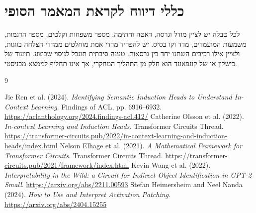 \documentclass[11pt,a4paper]{article}
\begin{document}
\section{כללי דיווח לקראת המאמר הסופי}
לכל טבלה יש לציין מודל וגרסה, דאטה וחתימה, מספר משפחות וקלטים, מספר הדגמות, משמעות המועמדים, מדד וקו בסיס. יש להפריד מדדי אמת מוחלטים ממדדי הצלחה בזוגות, ולציין אילו רכיבים השתנו יחד בין גרסאות. טענה סיבתית תוגבל לניסוי שבוצע. תיעוד של כישלון או של קונפאונד הוא חלק מן התהליך המחקרי, אך אינו תחליף לממצא מכניסטי.

\begin{thebibliography}{9}
\begin{english}
 Jie Ren et al. (2024). \emph{Identifying Semantic Induction Heads to Understand In-Context Learning}. Findings of ACL, pp. 6916--6932. \url{https://aclanthology.org/2024.findings-acl.412/}
 Catherine Olsson et al. (2022). \emph{In-context Learning and Induction Heads}. Transformer Circuits Thread. \url{https://transformer-circuits.pub/2022/in-context-learning-and-induction-heads/index.html}
 Nelson Elhage et al. (2021). \emph{A Mathematical Framework for Transformer Circuits}. Transformer Circuits Thread. \url{https://transformer-circuits.pub/2021/framework/index.html}
 Kevin Wang et al. (2022). \emph{Interpretability in the Wild: a Circuit for Indirect Object Identification in GPT-2 Small}. \url{https://arxiv.org/abs/2211.00593}
 Stefan Heimersheim and Neel Nanda (2024). \emph{How to Use and Interpret Activation Patching}. \url{https://arxiv.org/abs/2404.15255}
\end{english}
\end{thebibliography}
\end{document}
